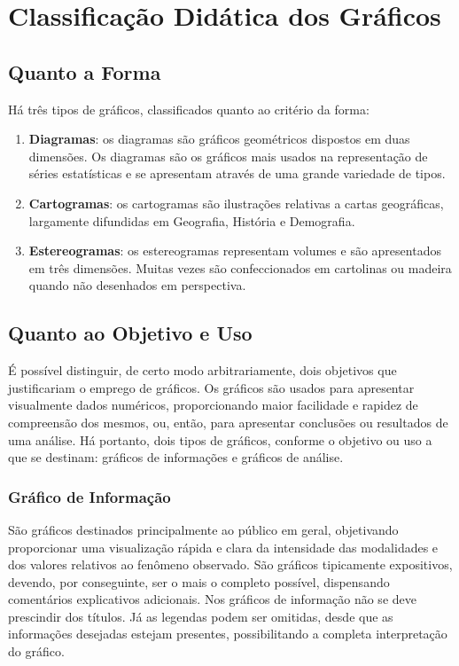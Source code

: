 \section{Classificação Didática dos Gráficos}
\subsection{Quanto a Forma}

Há três tipos de gráficos, classificados quanto ao critério da forma:

\begin{enumerate}
  \item \textbf{Diagramas}: os diagramas são gráficos geométricos dispostos em duas dimensões. Os diagramas são os gráficos mais usados na representação de séries estatísticas e se  apresentam através de uma grande variedade de tipos.
  \item \textbf{Cartogramas}: os cartogramas são ilustrações relativas a cartas geográficas, largamente difundidas em Geografia, História e Demografia.

\newpage
  \item \textbf{Estereogramas}: os estereogramas representam volumes e são apresentados em três dimensões. Muitas vezes são confeccionados em cartolinas ou madeira quando não desenhados em perspectiva.
\end{enumerate}

\subsection{Quanto ao Objetivo e Uso}

É possível distinguir, de certo modo arbitrariamente, dois objetivos que justificariam o emprego de gráficos. Os gráficos são usados para apresentar visualmente dados numéricos, proporcionando maior facilidade e rapidez de compreensão dos mesmos, ou, então, para apresentar conclusões ou resultados de uma análise. Há portanto, dois tipos de gráficos, conforme o objetivo ou uso a que se destinam: gráficos de informações e gráficos de análise.


\subsubsection{Gráfico de Informação}

São gráficos destinados principalmente ao público em geral, objetivando proporcionar uma visualização rápida e clara da intensidade das modalidades e dos valores relativos ao fenômeno observado. São gráficos tipicamente expositivos, devendo, por conseguinte, ser o mais o completo possível, dispensando comentários explicativos adicionais. Nos gráficos de informação não se deve prescindir dos títulos. Já as legendas podem ser omitidas, desde que as informações desejadas  estejam presentes, possibilitando a completa interpretação do gráfico.




